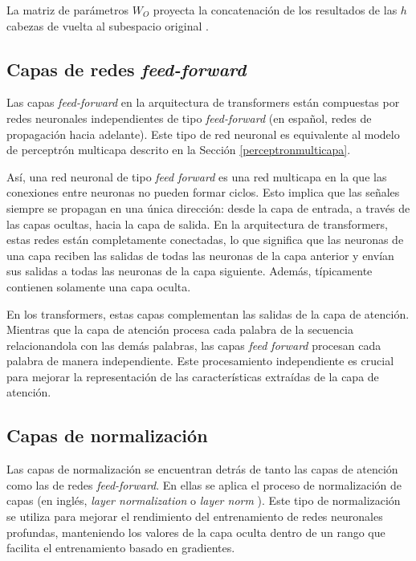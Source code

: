 \documentclass[11pt,spanish,listoffigures,listoftables]{tfgetsinf}
\begin{document}
La matriz de parámetros $W_O$ proyecta la concatenación de los resultados de las $h$ cabezas de vuelta al subespacio original \cite{cordonnier2021multiheadattentioncollaborateinstead, multiheaddotproduct, jurafsky2023speech}.

\subsection{Capas de redes \textit{feed-forward}}

Las capas \textit{feed-forward} en la arquitectura de transformers están compuestas por redes neuronales independientes de tipo \textit{feed-forward} (en español, redes de propagación hacia adelante). Este tipo de red neuronal es equivalente al modelo de perceptrón multicapa descrito en la Sección  \ref{perceptronmulticapa}.

Así, una red neuronal de tipo \textit{feed forward} es una red multicapa en la que las conexiones entre neuronas no pueden formar ciclos. Esto implica que las señales siempre se propagan en una única dirección: desde la capa de entrada, a través de las capas ocultas, hacia la capa de salida. En la arquitectura de transformers, estas redes están completamente conectadas, lo que significa que las neuronas de una capa reciben las salidas de todas las neuronas de la capa anterior y envían sus salidas a todas las neuronas de la capa siguiente. Además, típicamente contienen solamente una capa oculta.

En los transformers, estas capas complementan las salidas de la capa de atención. Mientras que la capa de atención procesa cada palabra de la secuencia relacionandola con las demás palabras, las capas \textit{feed forward} procesan cada palabra de manera independiente. Este procesamiento independiente es crucial para mejorar la representación de las características extraídas de la capa de atención.

\subsection{Capas de normalización}

Las capas de normalización se encuentran detrás de tanto las capas de atención como las de redes \textit{feed-forward}. En ellas se aplica el proceso de normalización de capas (en inglés, \textit{layer normalization} o \textit{layer norm} \cite{ba2016layernormalization}). Este tipo de normalización se utiliza para mejorar el rendimiento del entrenamiento de redes neuronales profundas, manteniendo los valores de la capa oculta dentro de un rango que facilita el entrenamiento basado en gradientes.
\end{document}

